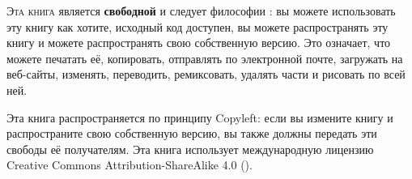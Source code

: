 \lettrine[lraise=-0.03,loversize=0.08]{Э}{та книга} является \textbf{свободной} и следует философии
:
вы можете использовать эту книгу как хотите, исходный код доступен, вы можете распространять
эту книгу и можете распространять свою собственную версию. Это означает, что можете печатать её,
копировать, отправлять по электронной почте, загружать на веб-сайты, изменять, переводить, ремиксовать, удалять части
и рисовать по всей ней.

Эта книга распространяется по принципу Copyleft: если вы измените книгу и распространите свою собственную версию, вы также должны передать эти свободы её получателям.
Эта книга использует международную лицензию Creative Commons Attribution-ShareAlike 4.0
(\href{http://creativecommons.org/licenses/by-sa/4.0/}{}).